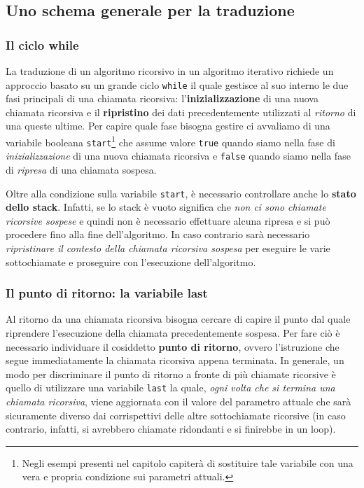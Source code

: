 \subsection{Uno schema generale per la traduzione}
\subsubsection{Il ciclo while}
La traduzione di un algoritmo ricorsivo in un algoritmo iterativo richiede un approccio basato su un grande ciclo \texttt{while} il quale gestisce al suo interno le due fasi principali di una chiamata ricorsiva: l'\textbf{inizializzazione} di una nuova chiamata ricorsiva e il \textbf{ripristino} dei dati precedentemente utilizzati al \textit{ritorno} di una queste ultime.  Per capire quale fase bisogna gestire ci avvaliamo di una variabile booleana \texttt{start}\footnote{Negli esempi presenti nel capitolo capiterà di sostituire tale variabile con una vera e propria condizione sui parametri attuali.} che assume valore \texttt{true} quando siamo nella fase di \textit{inizializzazione} di una nuova chiamata ricorsiva e \texttt{false} quando siamo nella fase di \textit{ripresa} di una chiamata sospesa.

Oltre alla condizione sulla variabile \texttt{start}, è necessario controllare anche lo \textbf{stato dello stack}. Infatti, se lo stack è vuoto significa che \textit{non ci sono chiamate ricorsive sospese} e quindi non è necessario effettuare alcuna ripresa e si può procedere fino alla fine dell'algoritmo. In caso contrario sarà necessario \textit{ripristinare il contesto della chiamata ricorsiva sospesa} per eseguire le varie sottochiamate e proseguire con l'esecuzione dell'algoritmo.

\subsubsection{Il punto di ritorno: la variabile last}
Al ritorno da una chiamata ricorsiva bisogna cercare di capire il punto dal quale riprendere l'esecuzione della chiamata precedentemente sospesa. Per fare ciò è necessario individuare il cosiddetto \textbf{punto di ritorno}, ovvero l'istruzione che segue immediatamente la chiamata ricorsiva appena terminata. In generale, un modo per discriminare il punto di ritorno a fronte di più chiamate ricorsive è quello di utilizzare una variabile \texttt{last} la quale, \textit{ogni volta che si termina una chiamata ricorsiva}, viene aggiornata con il valore del parametro attuale che sarà sicuramente diverso dai corrispettivi delle altre sottochiamate ricorsive (in caso contrario, infatti, si avrebbero chiamate ridondanti e si finirebbe in un loop).

